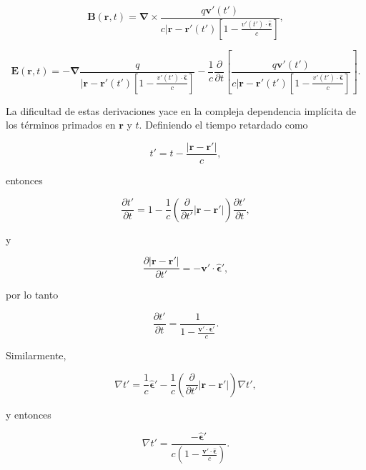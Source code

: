 \documentclass[a4paper,11pt]{article}
\numberwithin{equation}{section}
\begin{document}
\begin{equation}
 \mathbf{B}(\mathbf{r},t) = 
 \pmb{\nabla} \times \frac{q\mathbf{v}'(t')}{c|\mathbf{r}-\mathbf{r}'(t')\left[1 - 
 \frac{v'(t')\cdot \hat{\mathbf{\epsilon}}}{c}\right]},
\end{equation}

\begin{equation}
 \mathbf{E}(\mathbf{r},t) = - \pmb{\nabla}  \frac{q}{|\mathbf{r}-\mathbf{r}'(t')\left[1 - 
 \frac{v'(t')\cdot \hat{\mathbf{\epsilon}}}{c}\right]} - \frac{1}{c} 
 \frac{\partial}{\partial t}\left[\frac{q\mathbf{v}'(t')}{c|\mathbf{r}-\mathbf{r}'(t')\left[1 - 
 \frac{v'(t')\cdot \hat{\mathbf{\epsilon}}}{c}\right]} \right].
\end{equation}

La dificultad de estas derivaciones yace en la compleja dependencia implícita 
de los términos primados en $\mathbf{r}$ y $t$. Definiendo el tiempo retardado 
como 

\begin{equation}
 t' = t - \frac{|\mathbf{r} - \mathbf{r}'|}{c},
\end{equation}

entonces 

\begin{equation}
 \frac{\partial t'}{\partial t} = 1 - \frac{1}{c}\left(\frac{\partial}{\partial t'}
 |\mathbf{r} - \mathbf{r}'|\right)\frac{\partial t'}{\partial t},
\end{equation}

y

\begin{equation}
 \frac{\partial |\mathbf{r} - \mathbf{r}'|}{\partial t'} = - \mathbf{v}' \cdot 
 \hat{\mathbf{\epsilon}}',
\end{equation}

por lo tanto

\begin{equation}
 \frac{\partial t'}{\partial t} = \frac{1}{1 - \frac{\mathbf{v}' \cdot \mathbf{\epsilon}'}{c}}.
\end{equation}

Similarmente, 

\begin{equation}
 \nabla t' = \frac{1}{c}\hat{\mathbf{\epsilon}}' - 
 \frac{1}{c}\left(\frac{\partial}{\partial t'}|\mathbf{r} - \mathbf{r}'|\right)
 \nabla t',
\end{equation}

y entonces 

\begin{equation}
 \nabla t' = \frac{- \hat{\mathbf{\epsilon}}'}{c\left(1 - \frac{\mathbf{v}' 
 \cdot \hat{\mathbf{\epsilon}}}{c} \right)}.
\end{equation}
\end{document}
